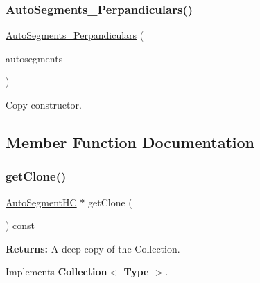 \subsubsection{\texorpdfstring{Auto\+Segments\+\_\+\+Perpandiculars()}{AutoSegments\_Perpandiculars()}\hspace{0.1cm}{\footnotesize\ttfamily [2/2]}}
{\footnotesize\ttfamily \mbox{\hyperlink{classKatabatic_1_1AutoSegments__Perpandiculars}{Auto\+Segments\+\_\+\+Perpandiculars}} (\begin{DoxyParamCaption}\item[{const \mbox{\hyperlink{classKatabatic_1_1AutoSegments__Perpandiculars}{Auto\+Segments\+\_\+\+Perpandiculars}} \&}]{autosegments }\end{DoxyParamCaption})\hspace{0.3cm}{\ttfamily [inline]}}

Copy constructor. 

\subsection{Member Function Documentation}
\mbox{\label{classKatabatic_1_1AutoSegments__Perpandiculars_a5b26b0698bdcb40cbf51b250dfb21858}} 
\subsubsection{\texorpdfstring{get\+Clone()}{getClone()}}
{\footnotesize\ttfamily \mbox{\hyperlink{namespaceKatabatic_acb3628dc7705fefe38a665cfe43efa6e}{Auto\+Segment\+HC}} $\ast$ get\+Clone (\begin{DoxyParamCaption}{ }\end{DoxyParamCaption}) const\hspace{0.3cm}{\ttfamily [virtual]}}

{\bfseries Returns\+:} A deep copy of the Collection. 

Implements \textbf{ Collection$<$ Type $>$}.

\mbox{\label{classKatabatic_1_1AutoSegments__Perpandiculars_a07665c070fcc269aec02ce842f384483}} 
